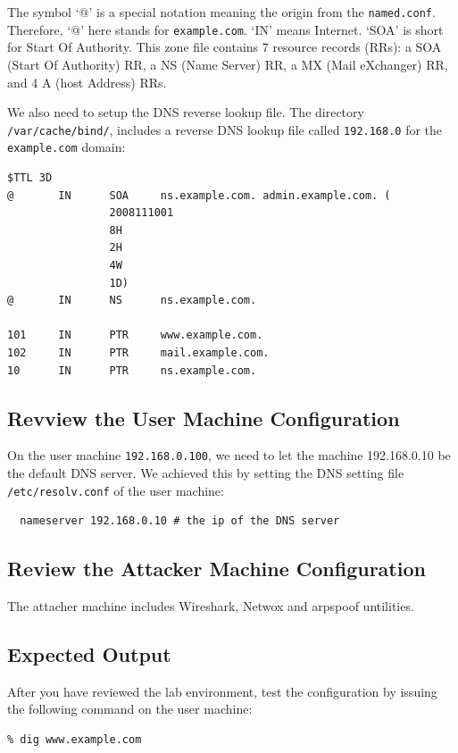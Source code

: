 The symbol `@' is a special notation meaning the origin from the {\tt named.conf}. 
Therefore, `@' here stands for {\tt example.com}. `IN' means Internet. 
`SOA' is short for Start Of Authority.
This zone file contains 7 resource records (RRs): a SOA (Start Of Authority) RR, 
a NS (Name Server) RR, a MX (Mail eXchanger) RR, and 4 A (host Address) RRs.

We also need to setup the DNS reverse lookup file.
The directory \texttt{/var/cache/bind/}, includes a reverse DNS lookup file 
called \texttt{192.168.0} for the \texttt{example.com} domain:
\begin{verbatim}
$TTL 3D
@       IN      SOA     ns.example.com. admin.example.com. (
                2008111001
                8H
                2H
                4W
                1D)
@       IN      NS      ns.example.com.

101     IN      PTR     www.example.com.
102     IN      PTR     mail.example.com.
10      IN      PTR     ns.example.com.
\end{verbatim}


\subsection{Revview the User Machine Configuration} 
\label{subsec:user_machine}

On the user machine {\tt 192.168.0.100}, we need to let the machine
192.168.0.10 be the default DNS server. We achieved this by setting
the DNS setting file \texttt{/etc/resolv.conf} of the user machine:

\begin{verbatim}
  nameserver 192.168.0.10 # the ip of the DNS server 
\end{verbatim}


\subsection{Review the Attacker Machine Configuration}

The attacher machine includes Wireshark, Netwox and arpspoof untilities.

\subsection{Expected Output}

After you have reviewed the lab environment, 
test the configuration by issuing the following
command on the user machine: 
\begin{verbatim}
% dig www.example.com
\end{verbatim}

